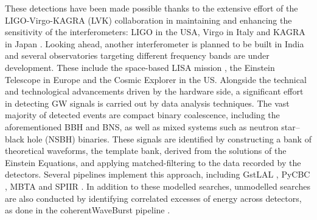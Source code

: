 \documentclass[aps,prd,twocolumn,superscriptaddress,nofootinbib, longbibliography]{revtex4-2}
\begin{document}
	These detections have been made possible thanks to the extensive effort of the LIGO-Virgo-KAGRA (LVK) collaboration in maintaining and enhancing the sensitivity of the interferometers: LIGO \cite{advligo2015} in the USA, Virgo \cite{advvirgo2015b} in Italy and KAGRA in Japan \cite{kagra_science_2020}. Looking ahead, another interferometer is planned to be built in India \cite{ligoindia2023} and several observatories targeting different frequency bands are under development. These include the space-based LISA mission \cite{nasa_lisa, lpf_overview}, the Einstein Telescope \cite{et_bluebook} in Europe and the Cosmic Explorer \cite{cosmic_explorer_horizon} in the US.
	Alongside the technical and technological advancements driven by the hardware side, a significant effort in detecting GW signals is carried out by data analysis techniques. The vast majority of detected events are compact binary coalescence, including the aforementioned BBH and BNS, as well as mixed systems such as neutron star--black hole (NSBH) binaries. These signals are identified by constructing a bank of theoretical waveforms, the template bank, derived from the solutions of the Einstein Equations, and applying matched-filtering to the data recorded by the detectors.
	Several pipelines implement this approach, including GstLAL \cite{gstlal1, gstlal2, gstlal3, gstlal4}, PyCBC \cite{pycbc2021}, MBTA \cite{mbta_o4_2025} and SPIIR \cite{spiir2}. In addition to these modelled searches, unmodelled searches are also conducted by identifying correlated excesses of energy across detectors, as done in the coherentWaveBurst pipeline \cite{cwb1, cwb2}. 
	
\end{document}
